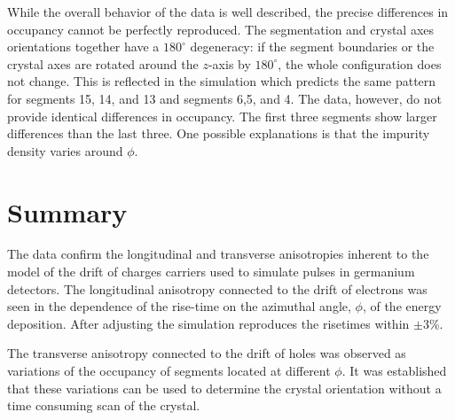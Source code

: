 While the overall behavior of the data is well described, the precise
differences in occupancy cannot be perfectly reproduced. The
segmentation and crystal axes orientations together have a
$180^{\circ}$ degeneracy: if the segment boundaries or the crystal
axes are rotated around the $z$-axis by $180^{\circ}$, the whole
configuration does not change. This is reflected in the simulation
which predicts the same pattern for segments 15, 14, and 13 and
segments 6,5, and 4. The data, however, do not provide identical
differences in occupancy. The first three segments show larger
differences than the last three. One possible explanations is that the
impurity density varies around $\phi$.


\section{Summary}
\label{sec:psa:sum}
The data confirm the longitudinal and transverse anisotropies inherent
to the model of the drift of charges carriers used to simulate pulses
in germanium detectors.  The longitudinal anisotropy connected to the
drift of electrons was seen in the dependence of the rise-time on the
azimuthal angle, $\phi$, of the energy deposition. After adjusting the
simulation reproduces the risetimes within $\pm$3\%.

The transverse anisotropy connected to the drift of holes was observed
as variations of the occupancy of segments located at different
$\phi$. It was established that these variations can be used to
determine the crystal orientation without a time consuming scan of the
crystal.


